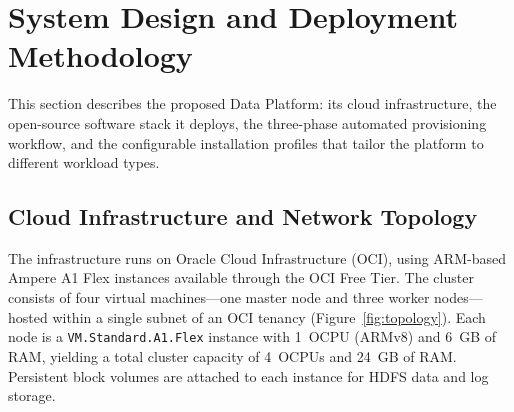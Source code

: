 %
%
%


\section{System Design and Deployment Methodology}
\label{sec:arch}


This section describes the proposed Data Platform: its cloud infrastructure, the
open-source software stack it deploys, the three-phase automated provisioning
workflow, and the configurable installation profiles that tailor the platform to
different workload types.

\subsection{Cloud Infrastructure and Network Topology}

The infrastructure runs on Oracle Cloud Infrastructure (OCI), using ARM-based
Ampere A1 Flex instances available through the OCI Free Tier. The cluster
consists of four virtual machines---one master node and three worker
nodes---hosted within a single subnet of an OCI tenancy
(Figure~\ref{fig:topology}). Each node is a \texttt{VM.Standard.A1.Flex}
instance with 1~OCPU (ARMv8) and 6~GB of RAM, yielding a total cluster capacity
of 4~OCPUs and 24~GB of RAM. Persistent block volumes are attached to each
instance for HDFS data and log storage.

